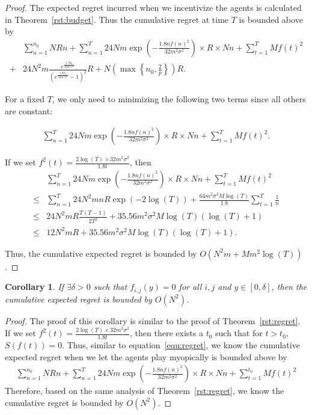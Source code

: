 \documentclass{article}
\newtheorem{corollary}{Corollary}
\begin{document}
\begin{proof}
The expected regret incurred when we incentivize the agents is calculated in Theorem~\ref{rst:budget}. Thus the cumulative regret at time $T$ is bounded above by
\begin{align}
&\sum_{n=1}^{n_{0}}NRn + \sum_{n=1}^{T} 24Nm\exp\left(-\frac{1.8n f(n)^2}{32 m^2\sigma^2}\right)\times R \times Nn+ \sum_{t=1}^{T}Mf(t)^2 \nonumber \\
+ & 24N^2 m \frac{e^{\frac{1.8\delta_{0}}{32m^2\sigma^2}}}{(e^{\frac{1.8\delta_{0}}{32m^2\sigma^2}}-1)^2}R+N\left(\max\left\{n_{0},\frac{2}{p}\right\}\right)R. \nonumber
\end{align}

For a fixed $T$, we only need to minimizing the following two terms since all others are constant:

\begin{align}
\sum_{n=1}^{T} 24Nm\exp\left(-\frac{1.8n f(n)^2}{32 m^2\sigma^2}\right)\times R \times Nn+ \sum_{t=1}^{T}Mf(t)^2.
\end{align}


If we set $f^2(t)=\frac{2\log(T)\times 32m^2\sigma^2}{1.8t}$, then
\begin{align}
&\sum_{n=1}^{T} 24Nm\exp\left(-\frac{1.8n f(n)^2}{32 m^2\sigma^2}\right)\times R \times Nn+ \sum_{t=1}^{T}Mf(t)^2 \nonumber \\ 
\leq & \sum_{n=1}^{T} 24N^2 mnR \exp\left(-2\log(T)\right)  + \frac{64m^2\sigma^2 M\log(T)}{1.8}\sum_{t=1}^{T}\frac{1}{n} \nonumber \\
\leq &  24N^2 m R\frac{T(T-1)}{2T^2}  + 35.56 m^2\sigma^2 M\log(T)(\log(T)+1) \nonumber \\
\leq &  12 N^2 m R  + 35.56 m^2\sigma^2 M\log(T)(\log(T)+1). \nonumber
\end{align}

Thus, the cumulative expected regret is bounded by $O(N^2 m + M m^2\log(T))$.
\end{proof}

\begin{corollary}
If $\exists \delta>0$ such that $f_{i,j}(y)=0$ for all $i,j$ and $y\in [0,\delta]$, then the cumulative expected regret is bounded by $O(N^2)$.
\end{corollary}

\begin{proof}
The proof of this corollary is similar to the proof of Theorem~\ref{rst:regret}. If we set $f^2(t)=\frac{2\log(T)\times 32m^2\sigma^2}{1.8t}$, then there exists a $t_{0}$ such that for $t>t_{0}$, $S(f(t))=0$. Thus, similar to equation~\eqref{equ:regret}, we know the cumulative expected regret when we let the agents play myopically is bounded above by
\begin{align}
\sum_{n=1}^{n_{0}}NRn + \sum_{n=1}^{T} 24Nm\exp\left(-\frac{1.8n f(n)^2}{32 m^2\sigma^2}\right)\times R \times Nn+ \sum_{t=1}^{t_{0}}Mf(t)^2 \nonumber
\end{align}
Therefore, based on the same analysis of Theorem~\ref{rst:regret}, we know the cumulative regret is bounded by $O(N^2)$.
\end{proof}
\end{document}
